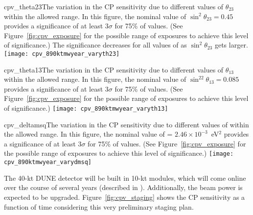 \begin{cdrfigure}{cpv_theta23}{The variation in the CP sensitivity due to different values of $\theta_{23}$ within the allowed range.  In this figure, the nominal value of $\sin^2\theta_{23} = 0.45$ provides a significance of at least 3$\sigma$ for 75\% of \deltacp values. (See Figure~\ref{fig:cpv_exposure} for the possible range of exposures to achieve this level of significance.) The significance decreases for all values of \deltacp as $\sin^2\theta_{23}$ gets larger.}
 \texttt{[image: cpv\_890ktmwyear\_varyth23]}
\end{cdrfigure}

\begin{cdrfigure}{cpv_theta13}{The variation in the CP sensitivity due to different values of $\theta_{13}$ within the allowed range.  In this figure, the nominal value of $\sin^22\theta_{13} = 0.085$ provides a significance of at least 3$\sigma$ for 75\% of \deltacp values. (See Figure~\ref{fig:cpv_exposure} for the possible range of exposures to achieve this level of significance.)}
 \texttt{[image: cpv\_890ktmwyear\_varyth13]}
\end{cdrfigure}

\begin{cdrfigure}{cpv_deltamsq}{The variation in the CP sensitivity due to different values of  within the allowed range.  In this figure, the nominal value of  = $2.46\times 10^{-3}$~eV$^2$ provides a significance of at least 3$\sigma$ for 75\% of \deltacp values.  (See Figure~\ref{fig:cpv_exposure} for the possible range of exposures to achieve this level of significance.)}
 \texttt{[image: cpv\_890ktmwyear\_varydmsq]}
\end{cdrfigure}

The 40-kt DUNE detector will be built in 10-kt modules, which will come online over the course of several years (described in \voldune).  Additionally, the beam power is expected to be upgraded. Figure~\ref{fig:cpv_staging} shows the CP sensitivity as a function of time considering this very preliminary staging plan. 


